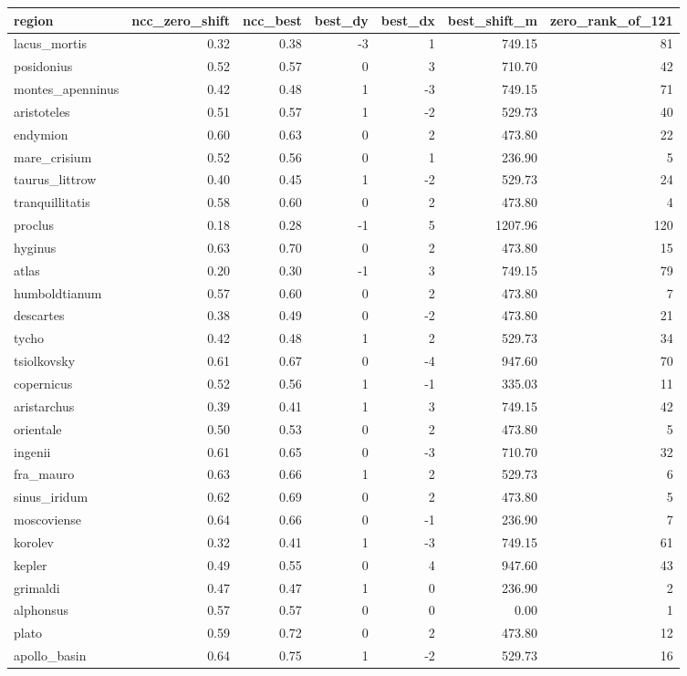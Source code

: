 \begin{tabular}{lrrrrrr}
\toprule
region & ncc\_zero\_shift & ncc\_best & best\_dy & best\_dx & best\_shift\_m & zero\_rank\_of\_121 \\
\midrule
lacus\_mortis & 0.32 & 0.38 & -3 & 1 & 749.15 & 81 \\
posidonius & 0.52 & 0.57 & 0 & 3 & 710.70 & 42 \\
montes\_apenninus & 0.42 & 0.48 & 1 & -3 & 749.15 & 71 \\
aristoteles & 0.51 & 0.57 & 1 & -2 & 529.73 & 40 \\
endymion & 0.60 & 0.63 & 0 & 2 & 473.80 & 22 \\
mare\_crisium & 0.52 & 0.56 & 0 & 1 & 236.90 & 5 \\
taurus\_littrow & 0.40 & 0.45 & 1 & -2 & 529.73 & 24 \\
tranquillitatis & 0.58 & 0.60 & 0 & 2 & 473.80 & 4 \\
proclus & 0.18 & 0.28 & -1 & 5 & 1207.96 & 120 \\
hyginus & 0.63 & 0.70 & 0 & 2 & 473.80 & 15 \\
atlas & 0.20 & 0.30 & -1 & 3 & 749.15 & 79 \\
humboldtianum & 0.57 & 0.60 & 0 & 2 & 473.80 & 7 \\
descartes & 0.38 & 0.49 & 0 & -2 & 473.80 & 21 \\
tycho & 0.42 & 0.48 & 1 & 2 & 529.73 & 34 \\
tsiolkovsky & 0.61 & 0.67 & 0 & -4 & 947.60 & 70 \\
copernicus & 0.52 & 0.56 & 1 & -1 & 335.03 & 11 \\
aristarchus & 0.39 & 0.41 & 1 & 3 & 749.15 & 42 \\
orientale & 0.50 & 0.53 & 0 & 2 & 473.80 & 5 \\
ingenii & 0.61 & 0.65 & 0 & -3 & 710.70 & 32 \\
fra\_mauro & 0.63 & 0.66 & 1 & 2 & 529.73 & 6 \\
sinus\_iridum & 0.62 & 0.69 & 0 & 2 & 473.80 & 5 \\
moscoviense & 0.64 & 0.66 & 0 & -1 & 236.90 & 7 \\
korolev & 0.32 & 0.41 & 1 & -3 & 749.15 & 61 \\
kepler & 0.49 & 0.55 & 0 & 4 & 947.60 & 43 \\
grimaldi & 0.47 & 0.47 & 1 & 0 & 236.90 & 2 \\
alphonsus & 0.57 & 0.57 & 0 & 0 & 0.00 & 1 \\
plato & 0.59 & 0.72 & 0 & 2 & 473.80 & 12 \\
apollo\_basin & 0.64 & 0.75 & 1 & -2 & 529.73 & 16 \\
\bottomrule
\end{tabular}
